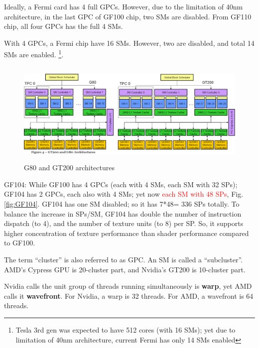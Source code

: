 Ideally, a Fermi card has 4 full GPCs. However, due to the limitation of 40nm
architecture, in the last GPC of GF100 chip, two SMs are disabled. From GF110
chip, all four GPCs has the full 4 SMs.

With 4 GPCs, a Fermi chip have 16 SMs. However, two are disabled, and total 14
SMs are enabled. \footnote{ Tesla 3rd gen was expected to have 512 cores (with
16 SMs); yet due to limitation of 40nm architecture, current Fermi has only 14
SMs enabled}.

\begin{figure}[hbt]
  \centerline{\includegraphics[height=5cm,
    angle=0]{./images/g80_gt200.eps}}
  \caption{G80 and GT200 architectures}
  \label{fig:g80_gt200}
\end{figure}

\begin{framed}

GF104:  While GF100 has 4 GPCs (each with 4 SMs, each SM with 32 SPs); GF104 has
2 GPCs, each also with 4 SMs; yet now \textcolor{red}{each SM with
  48 SPs}, Fig.\ref{fig:GF104}. GF104 has one SM disabled; so it has 7*48= 336
  SPs totally. To balance the increase in SPs/SM, GF104 has double the number of
  instruction dispatch (to 4), and the number of texture units (to 8) per SP.
  So, it supports higher concentration of texture performance than shader
  performance compared to GF100.
\end{framed}

\begin{framed}
  The term ``cluster'' is also referred to as GPC. An SM is called a
  ``subcluster''. AMD's Cypress GPU is 20-cluster part, and Nvidia's
  GT200 is 10-cluster part.

  Nvidia calls the unit group of threads running simultaneously is
  {\bf warp}, yet AMD calls it {\bf wavefront}. For Nvidia, a warp is
  32 threads. For AMD, a wavefront is 64 threads. 
\end{framed}

